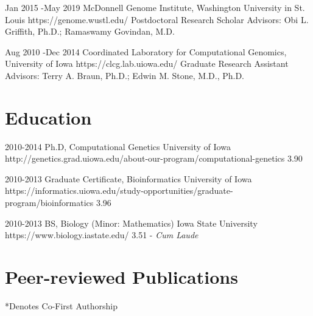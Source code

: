 \documentclass[10pt]{article} %
\begin{document}

\job
{Jan 2015 -}{May 2019}
{McDonnell Genome Institute, Washington University in St. Louis}
{https://genome.wustl.edu/}
{Postdoctoral Research Scholar}
{Advisors: Obi L. Griffith, Ph.D.; Ramaswamy Govindan, M.D.}


\job
{Aug 2010 -}{Dec 2014}
{Coordinated Laboratory for Computational Genomics, University of Iowa}
{https://clcg.lab.uiowa.edu/}
{Graduate Research Assistant}
{Advisors: Terry A. Braun, Ph.D.; Edwin M. Stone, M.D., Ph.D.}


\section{Education}

\edu
{2010-2014}
{Ph.D, Computational Genetics}
{University of Iowa}
{http://genetics.grad.uiowa.edu/about-our-program/computational-genetics}
{3.90}


\edu
{2010-2013}
{Graduate Certificate, Bioinformatics}
{University of Iowa}
{https://informatics.uiowa.edu/study-opportunities/graduate-program/bioinformatics}
{3.96}


\edu
{2010-2013}
{BS, Biology (Minor: Mathematics)}
{Iowa State University}
{https://www.biology.iastate.edu/}
{3.51  - \textit{Cum Laude}}


\section{Peer-reviewed Publications}

*Denotes Co-First Authorship

\begin{enumerate}
 


\end{enumerate}
\end{document}
